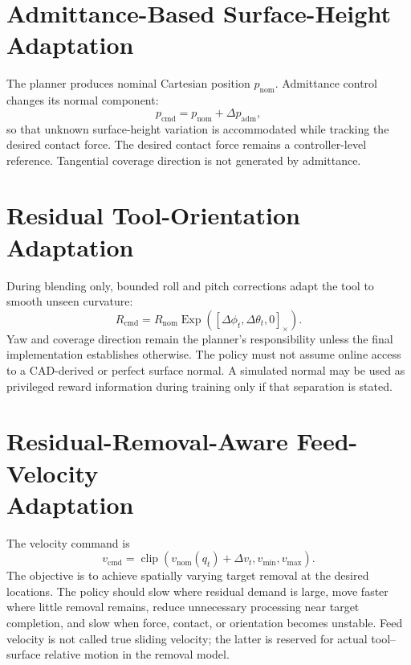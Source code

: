 \section{Admittance-Based Surface-Height Adaptation}
The planner produces nominal Cartesian position \(p_{\mathrm{nom}}\). Admittance control changes its normal component:
\begin{equation}
  p_{\mathrm{cmd}}=p_{\mathrm{nom}}+\Delta p_{\mathrm{adm}},
  \label{eq:blending_admittance}
\end{equation}
so that unknown surface-height variation is accommodated while tracking the desired contact force. The desired contact force remains a controller-level reference. Tangential coverage direction is not generated by admittance.

\section{Residual Tool-Orientation Adaptation}
During blending only, bounded roll and pitch corrections adapt the tool to smooth unseen curvature:
\begin{equation}
  R_{\mathrm{cmd}}
  =
  R_{\mathrm{nom}}
  \operatorname{Exp}\!\left(
    [\Delta\phi_t,\Delta\theta_t,0]_\times
  \right).
  \label{eq:orientation_residual}
\end{equation}
Yaw and coverage direction remain the planner's responsibility unless the final implementation establishes otherwise. The policy must not assume online access to a CAD-derived or perfect surface normal. A simulated normal may be used as privileged reward information during training only if that separation is stated.

\section[Residual-Removal-Aware Feed-Velocity Adaptation]{Residual-Removal-Aware Feed-Velocity\\ Adaptation}
The velocity command is
\begin{equation}
  v_{\mathrm{cmd}}
  =
  \operatorname{clip}
  \left(v_{\mathrm{nom}}(q_t)+\Delta v_t,
  v_{\min},v_{\max}\right).
  \label{eq:velocity_residual}
\end{equation}
The objective is to achieve spatially varying target removal at the desired locations. The policy should slow where residual demand is large, move faster where little removal remains, reduce unnecessary processing near target completion, and slow when force, contact, or orientation becomes unstable. Feed velocity is not called true sliding velocity; the latter is reserved for actual tool--surface relative motion in the removal model.

